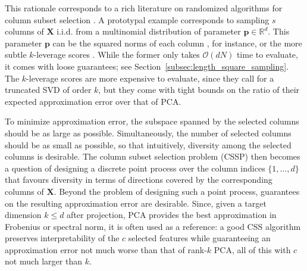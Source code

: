 \documentclass[twoside,11pt]{book}
\numberwithin{theorem}{chapter}
\numberwithin{definition}{chapter}
\numberwithin{proposition}{chapter}
\numberwithin{corollary}{chapter}
\numberwithin{example}{chapter}
\numberwithin{lemma}{chapter}
\numberwithin{assumption}{chapter}
\newcommand{\pc}[1]{\textcolor{blue}{#1}}
\begin{document}
This rationale corresponds to a rich literature on randomized algorithms for column subset selection \citep{DeVe06,DrMaMu07,BoDrMI11}. A prototypal example corresponds to sampling $s$ columns of $\bm{X}$ i.i.d. from a multinomial distribution of parameter $\bm{p} \in \mathbb{R}^{d}$. This parameter $\bm{p}$ can be the squared norms of each column \citep{DFKVV04}, for instance, or the more subtle $k$-leverage scores \citep{DrMaMu07}. While the former only takes $\mathcal{O}(d N)$ time to evaluate, it comes with loose guarantees; see Section~\ref{subsec:length_square_sampling}. The $k$-leverage scores are more expensive to evaluate, since they call for a truncated SVD of order $k$, but they come with tight bounds on the ratio of their expected approximation error over that of PCA.

To minimize approximation error, the subspace spanned by the selected columns should be as large as possible. Simultaneously, the number of selected columns should be as small as possible, so that intuitively, diversity among the selected columns is desirable. The column subset selection problem (CSSP) then becomes a question of designing a discrete point process over the column indices $\{1,\dots,d\}$ that favours diversity in terms of directions covered by the corresponding columns of $\bm{X}$.
Beyond the problem of designing such a point process, guarantees on the resulting approximation error are desirable. Since, given a target dimension $k\leq d$ after projection, PCA provides the best approximation in Frobenius or spectral norm, it is often used as a reference: a good CSS algorithm preserves interpretability of the $c$ selected features while guaranteeing an approximation error not much worse than that of rank-$k$ PCA, all of this with $c$ not much larger than $k$.
\end{document}

